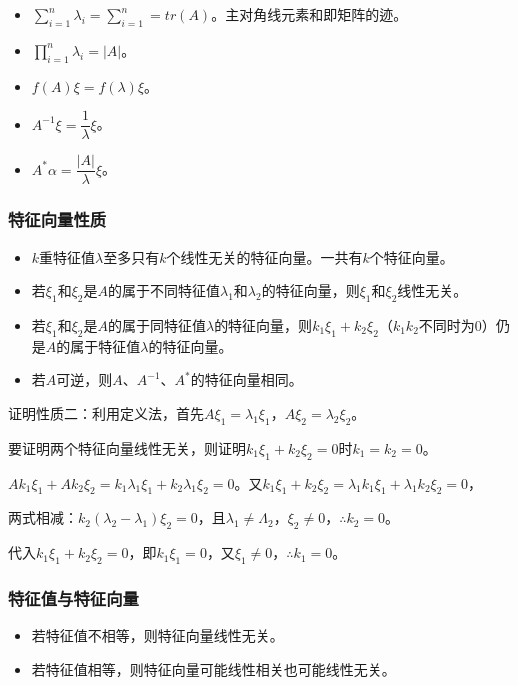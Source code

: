 \documentclass[UTF8, 12pt]{ctexart}
\begin{document}
\begin{itemize}
\item $\sum\limits_{i=1}^n\lambda_i=\sum\limits_{i=1}^n=tr(A)$。主对角线元素和即矩阵的迹。
\item $\prod\limits_{i=1}^n\lambda_i=\vert A\vert$。
\item $f(A)\xi=f(\lambda)\xi$。
\item $A^{-1}\xi=\dfrac{1}{\lambda}\xi$。
\item $A^*\alpha=\dfrac{\vert A\vert}{\lambda}\xi$。
\end{itemize}

\subsubsection{特征向量性质}

\begin{itemize}
\item $k$重特征值$\lambda$至多只有$k$个线性无关的特征向量。一共有$k$个特征向量。
\item 若$\xi_1$和$\xi_2$是$A$的属于不同特征值$\lambda_1$和$\lambda_2$的特征向量，则$\xi_1$和$\xi_2$线性无关。
\item 若$\xi_1$和$\xi_2$是$A$的属于同特征值$\lambda$的特征向量，则$k_1\xi_1+k_2\xi_2$（$k_1k_2$不同时为0）仍是$A$的属于特征值$\lambda$的特征向量。
\item 若$A$可逆，则$A$、$A^{-1}$、$A^*$的特征向量相同。
\end{itemize}

证明性质二：利用定义法，首先$A\xi_1=\lambda_1\xi_1$，$A\xi_2=\lambda_2\xi_2$。

要证明两个特征向量线性无关，则证明$k_1\xi_1+k_2\xi_2=0$时$k_1=k_2=0$。

$Ak_1\xi_1+Ak_2\xi_2=k_1\lambda_1\xi_1+k_2\lambda_1\xi_2=0$。又$k_1\xi_1+k_2\xi_2=\lambda_1k_1\xi_1+\lambda_1k_2\xi_2=0$，

两式相减：$k_2(\lambda_2-\lambda_1)\xi_2=0$，且$\lambda_1\neq\Lambda_2$，$\xi_2\neq0$，$\therefore k_2=0$。

代入$k_1\xi_1+k_2\xi_2=0$，即$k_1\xi_1=0$，又$\xi_1\neq0$，$\therefore k_1=0$。

\subsubsection{特征值与特征向量}

\begin{itemize}
\item 若特征值不相等，则特征向量线性无关。
\item 若特征值相等，则特征向量可能线性相关也可能线性无关。
\end{itemize}
\end{document}
